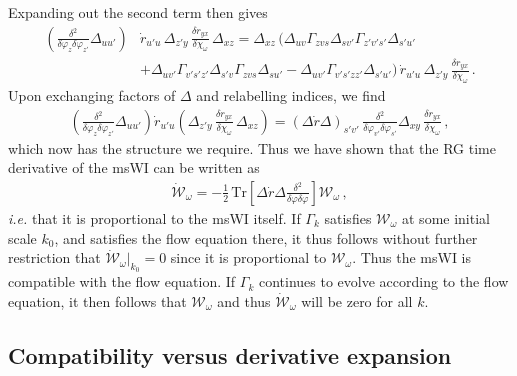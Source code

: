 \documentclass[11pt]{book} %
\numberwithin{equation}{chapter}
\begin{document}
Expanding out the second term then gives
\begin{align}
\label{step1}
	\left(\frac{\delta^2}{\delta\varphi_z\delta\varphi_{z'}}\Delta_{uu'}\right)
	&\dot r_{u'u} \, \Delta_{z'y} \, \frac{\delta r_{yx}}{\delta\chi_\omega} \, \Delta_{xz}
  = \Delta_{xz} \, \bigg(\Delta_{uv}\Gamma_{zvs}\Delta_{sv'}\Gamma_{z'v's'}\Delta_{s'u'} \nonumber\\
  &+\Delta_{uv'}\Gamma_{v's'z'}\Delta_{s'v}\Gamma_{zvs}\Delta_{su'}
	-\Delta_{uv'}\Gamma_{v's'zz'}\Delta_{s'u'}\bigg) \,
	\dot r_{u'u} \, \Delta_{z'y} \, \frac{\delta r_{yx}}{\delta\chi_\omega} \,.
\end{align}
Upon exchanging factors of $\Delta$ and relabelling indices, we find
\begin{align}
\label{step2}
	\left(\frac{\delta^2}{\delta\varphi_{z}\delta\varphi_{z'}}\Delta_{uu'}\right)
	\dot r_{u'u}\left(\Delta_{z'y} \, \frac{\delta r_{yx}}{\delta\chi_{\omega}} \, \Delta_{xz}\right)=
	(\Delta\dot r\Delta)_{s'v'} \, \frac{\delta^2}{\delta\varphi_{v'}\delta\varphi_{s'}}
	\Delta_{xy} \, \frac{\delta r_{yx}}{\delta\chi_{\omega}} \,,
\end{align}
which now has the structure we require.
Thus we have shown that the RG time derivative of the msWI can be written as
\begin{align}
	\mathcal{\dot W}_{\omega}=-\frac{1}{2} \, \mathrm{Tr}
	\left[\Delta \dot r\Delta\frac{\delta^2}{\delta\varphi\delta\varphi}\right]\mathcal{W}_{\omega} \,,
\end{align}
\emph{i.e.} that it is proportional to the msWI itself.
If $\Gamma_{k}$ satisfies $\mathcal{W_\omega}$ at some initial scale $k_0$,
and satisfies the flow equation there, it thus follows without further restriction that
$\mathcal{\dot W_\omega}|_{k_{0}}=0$ since it is proportional to $\mathcal{W_\omega}$.
Thus the msWI is compatible with the flow equation.
If $\Gamma_{k}$ continues to evolve according to the flow equation,
it then follows that $\mathcal{W_\omega}$ and thus $\mathcal{\dot W_\omega}$ will be zero for all $k$.


\subsection{Compatibility versus derivative expansion}
\label{sec:exact-vs-derivatives}
\end{document}
